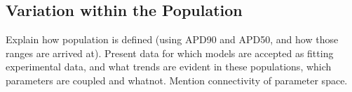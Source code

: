 \documentclass[../thesis-main.tex]{subfiles}
\begin{document}
 \subsection{Variation within the Population}
 \label{subsec:population-trends}
 Explain how population is defined (using APD90 and APD50, and how those ranges are arrived at). Present data for which models are accepted as fitting experimental data, and what trends are evident in these populations, \eg{} which parameters are coupled and whatnot. Mention connectivity of parameter space.
 

 \biblio
 
 
\end{document}
